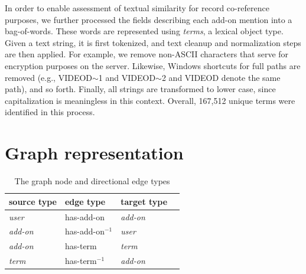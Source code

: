 \documentclass[11pt,oneside]{book}
\let\Oldsection\section
\renewcommand{\section}{\FloatBarrier\Oldsection}
\begin{document}
In order to enable assessment of textual similarity for record co-reference purposes, we further processed the fields describing each add-on mention into a bag-of-words. These words are represented using {\it terms}, a lexical object type. Given a text string, it is first tokenized, and text cleanup and normalization steps are then applied. For example, we remove non-ASCII characters that serve for encryption purposes on the server. Likewise,  Windows shortcuts for full paths are removed (e.g., VIDEOD$\sim$1 and VIDEOD$\sim$2 and VIDEOD denote the same path), and so forth. Finally, all strings are transformed to lower case, since capitalization is meaningless in this context. Overall, 167,512 unique terms were identified in this process.


\section{Graph representation}
\label{sec:graph_representation}
\begin{table}[t]
\begin{center}
\begin{small}
\begin{tabular}{llll}
\hline 
\textbf{source type} & \textbf{edge type} & \textbf{target type} \\
\hline
{\it user} & has-add-on & {\it add-on} \\
\hline
{\it add-on} &  has-add-on$^{-1}$ & {\it user} \\
{\it add-on} & has-term & {\it term} \\
\hline
{\it term} & has-term$^{-1}$ & {\it add-on} \\
\hline
\end{tabular}
\end{small}
\end{center}
\caption{\label{tab:graph_structure} The graph node and directional edge types}
\end{table}
\end{document}

